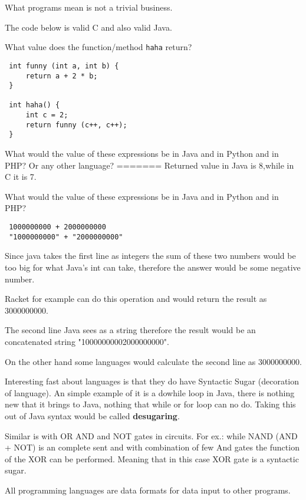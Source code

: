 \documentclass{article}
\begin{document}
\begin{flushleft}
What programs mean is not a trivial business.

The code below is valid C and also valid Java.

What value does the function/method \verb|haha| return?


\begin{verbatim}
 int funny (int a, int b) {
     return a + 2 * b;
 }
 
 int haha() {
     int c = 2;
     return funny (c++, c++);
 }
\end{verbatim}

What would the value of these expressions be in Java and in Python and in PHP? Or any other language?
=======
Returned value in Java is 8,while in C it is 7.

What would the value of these expressions be in Java and in Python and in PHP?
\begin{verbatim}
 1000000000 + 2000000000
 "1000000000" + "2000000000"
\end{verbatim}

Since java takes the first line as integers the sum of these two numbers would be too big for what Java's int can take, therefore the answer would be some negative number.

Racket for example can do this operation and would return the result as 3000000000.


The second line Java sees as a string therefore the result would be an concatenated string "10000000002000000000".

On the other hand some languages would calculate the second line as 3000000000.
\setlength{\parindent}{10ex}

\par Interesting fast about languages is that they do have Syntactic Sugar (decoration of language). An simple example of it is a dowhile loop in Java, there is nothing new that it brings to Java, nothing that while or for loop can no do. Taking this out of Java syntax would be called \textbf{desugaring}.

\noindent
Similar is with OR AND and NOT gates in circuits. For ex.: while NAND (AND + NOT) is an complete sent and with combination of few And gates the function of the XOR can be performed. Meaning that in this case XOR gate is a syntactic sugar.

All programming languages are data formats for data input to other programs.


\end{flushleft}
\end{document}
